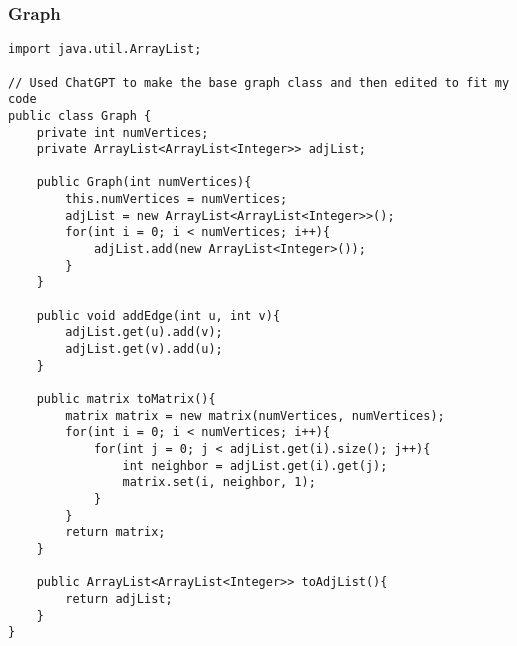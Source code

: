 \documentclass[10pt]{article}
\begin{document}
\subsubsection{Graph}
\lstset{numbers=left, numberstyle=\tiny, stepnumber=1, numbersep=5pt, basicstyle=\footnotesize\ttfamily}
\begin{lstlisting}[frame=single, ]  
import java.util.ArrayList;

// Used ChatGPT to make the base graph class and then edited to fit my code
public class Graph {
    private int numVertices;
    private ArrayList<ArrayList<Integer>> adjList;
    
    public Graph(int numVertices){
        this.numVertices = numVertices;
        adjList = new ArrayList<ArrayList<Integer>>();
        for(int i = 0; i < numVertices; i++){
            adjList.add(new ArrayList<Integer>());
        }
    }
    
    public void addEdge(int u, int v){
        adjList.get(u).add(v);
        adjList.get(v).add(u);
    }
    
    public matrix toMatrix(){
        matrix matrix = new matrix(numVertices, numVertices);
        for(int i = 0; i < numVertices; i++){
            for(int j = 0; j < adjList.get(i).size(); j++){
                int neighbor = adjList.get(i).get(j);
                matrix.set(i, neighbor, 1);
            }
        }
        return matrix;
    }

    public ArrayList<ArrayList<Integer>> toAdjList(){
        return adjList;
    }
}
\end{lstlisting}
\end{document}
